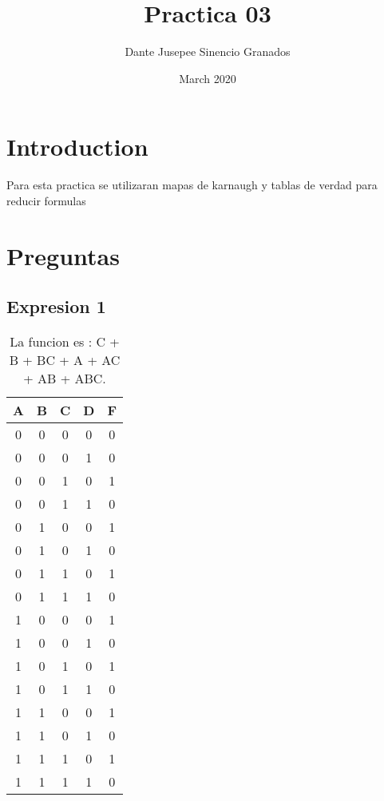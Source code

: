 \documentclass{article}
\title{Practica 03}
\author{Dante Jusepee Sinencio Granados}
\affil{Facultad de ciencias, UNAM}
\date{March 2020}
\begin{document}
\maketitle

\section{Introduction}
Para esta practica se utilizaran mapas de karnaugh y tablas de verdad para reducir formulas

\section{Preguntas}

\subsection{Expresion 1}
\begin{table}[H]
  \centering
    \begin{tabular}{| c | c | c | c | c |}
      \hline \cellcolor{gray!25}A & \cellcolor{gray!25}B & \cellcolor{gray!25}C & \cellcolor{gray!25}D & \cellcolor{gray!25}F \\ \hline
      0 & 0 & 0 & 0 & \cellcolor{blue!10}0\\ \hline
      0 & 0 & 0 & 1 & \cellcolor{blue!10}0\\ \hline
      0 & 0 & 1 & 0 & \cellcolor{blue!25}1\\ \hline
      0 & 0 & 1 & 1 & \cellcolor{blue!10}0\\ \hline
      0 & 1 & 0 & 0 & \cellcolor{blue!25}1\\ \hline
      0 & 1 & 0 & 1 & \cellcolor{blue!10}0\\ \hline
      0 & 1 & 1 & 0 & \cellcolor{blue!25}1\\ \hline
      0 & 1 & 1 & 1 & \cellcolor{blue!10}0\\ \hline
      1 & 0 & 0 & 0 & \cellcolor{blue!25}1\\ \hline
      1 & 0 & 0 & 1 & \cellcolor{blue!10}0\\ \hline
      1 & 0 & 1 & 0 & \cellcolor{blue!25}1\\ \hline
      1 & 0 & 1 & 1 & \cellcolor{blue!10}0\\ \hline
      1 & 1 & 0 & 0 & \cellcolor{blue!25}1\\ \hline
      1 & 1 & 0 & 1 & \cellcolor{blue!10}0\\ \hline
      1 & 1 & 1 & 0 & \cellcolor{blue!25}1\\ \hline
      1 & 1 & 1 & 1 & \cellcolor{blue!10}0\\ \hline
    \end{tabular}
  \caption{La funcion es : C + B + BC + A + AC + AB + ABC.}
\end{table}
\end{document}
